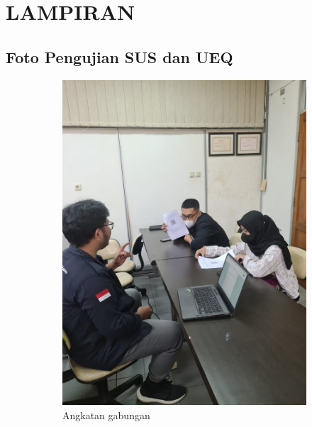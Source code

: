 \chapter*{LAMPIRAN}

\section{Foto Pengujian SUS dan UEQ}
\begin{figure}[H]
	\centering
	\begin{subfigure}[b]{0.45\textwidth}
		\centering
	  \includegraphics[width=\linewidth]{contents/appendix/sus1.jpg}
	  \caption{Angkatan gabungan}
	  \label{fig:Lampiran}
	\end{subfigure}
	\begin{subfigure}[b]{0.45\textwidth}
		\centering

\end{subfigure}
\end{figure}
